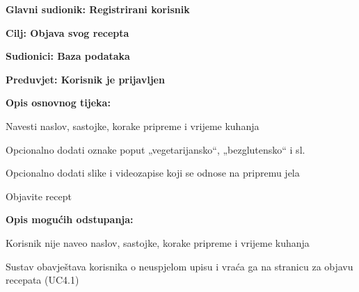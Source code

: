 	\noindent {}
	\begin{packed_item}
		
		\item \textbf{Glavni sudionik: Registrirani korisnik }
		\item  \textbf{Cilj: Objava svog recepta} 
		\item  \textbf{Sudionici: Baza podataka} 
		\item  \textbf{Preduvjet: Korisnik je prijavljen} 
		\item  \textbf{Opis osnovnog tijeka:}
		
		\item[] \begin{packed_enum}
			
			\item Navesti naslov, sastojke, korake pripreme i vrijeme kuhanja
			\item Opcionalno dodati oznake poput „vegetarijansko“, „bezglutensko“ i sl.
			\item Opcionalno dodati slike i videozapise koji se odnose na pripremu jela
			\item Objavite recept
			
		\end{packed_enum}
		
		\item  \textbf{Opis mogućih odstupanja:}
		
		\item[] \begin{packed_item}
			
			\item[2.a] Korisnik nije naveo naslov, sastojke, korake pripreme i vrijeme kuhanja
			\item[] \begin{packed_enum}
				
				\item Sustav obavještava korisnika o neuspjelom upisu i vraća ga na stranicu za objavu recepata (UC4.1)
				
			\end{packed_enum}
			
		\end{packed_item}
	\end{packed_item}
	
